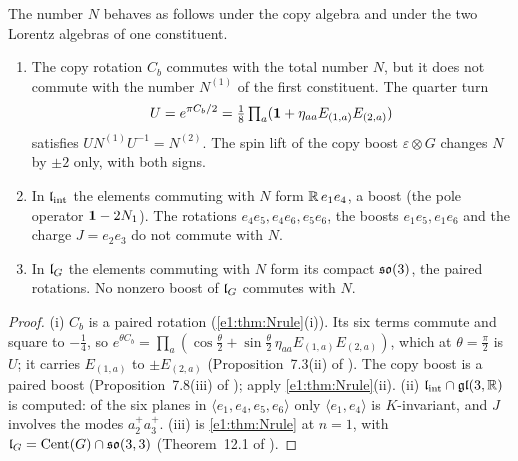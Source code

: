 \begin{proposition}
\label{e1:prop:Nlorentz}
The number $N$ behaves as follows under the copy algebra and under the two Lorentz algebras of one constituent.
\begin{enumerate}[label=(\roman*),leftmargin=2.2em]
\item The copy rotation $C_b$ commutes with the total number $N$, but it does not commute with the number $N^{(1)}$ of the first
constituent. The quarter turn
\[
U=e^{\pi C_b/2}=\tfrac18\textstyle\prod_a(\mathbf 1+\eta_{aa}E_{(1,a)}E_{(2,a)})
\]
satisfies $UN^{(1)}U^{-1}=N^{(2)}$. The spin lift of the copy boost $\varepsilon\otimes G$ changes $N$ by $\pm2$ only, with both signs.
\item In $\mathfrak l_{\rm int}$ the elements commuting with $N$ form $\mathbb{R}\,e_1e_4$, a boost (the pole operator $\mathbf 1-2N_1$). The rotations $e_4e_5,e_4e_6,e_5e_6$, the
boosts $e_1e_5,e_1e_6$ and the charge $J=e_2e_3$ do not commute with $N$.
\item In $\mathfrak l_G$ the elements commuting with $N$ form its compact $\mathfrak{so}(3)$, the paired rotations. No nonzero boost of $\mathfrak l_G$ commutes with $N$.
\end{enumerate}
\end{proposition}

\begin{proof}
(i) $C_b$ is a paired rotation (\cref{e1:thm:Nrule}(i)). Its six terms commute and square to $-\tfrac14$, so
$e^{\theta C_b}=\prod_a(\cos\tfrac\theta2+\sin\tfrac\theta2\,\eta_{aa}E_{(1,a)}E_{(2,a)})$, which at $\theta=\tfrac\pi2$ is $U$; it carries $E_{(1,a)}$ to
$\pm E_{(2,a)}$ (Proposition~7.3(ii) of \cite{RE}). The copy
boost is a paired boost (Proposition~7.8(iii) of \cite{RE}); apply \cref{e1:thm:Nrule}(ii). (ii) $\mathfrak l_{\rm int}\cap\mathfrak{gl}(3,\mathbb{R})$ is computed: of
the six planes in $\langle e_1,e_4,e_5,e_6\rangle$ only $\langle e_1,e_4\rangle$ is $K$-invariant, and $J$ involves the modes $a^+_2a^+_3$. (iii) is
\cref{e1:thm:Nrule} at $n=1$, with $\mathfrak l_G=\operatorname{Cent}(G)\cap\mathfrak{so}(3,3)$ (Theorem~12.1 of \cite{ES17}).
\end{proof}

